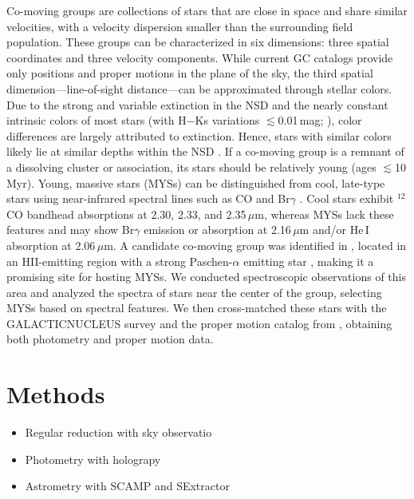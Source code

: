 \documentclass{aa} %
\begin{document}
{	Co-moving groups are collections of stars that are close in space and share similar velocities, with a velocity dispersion smaller than the surrounding field population. These groups can be characterized in six dimensions: three spatial coordinates and three velocity components. While current GC catalogs provide only positions and proper motions in the plane of the sky, the third spatial dimension—line-of-sight distance—can be approximated through stellar colors. Due to the strong and variable extinction in the NSD \citep{GNSIV, Ban_catalog, paco_NSD} and the nearly constant intrinsic colors of most stars (with H$-$Ks variations $\lesssim$0.01\,mag; \citealt[see Fig.~33]{GNSI}), color differences are largely attributed to extinction. Hence, stars with similar colors likely lie at similar depths within the NSD \citep{paco_NSD}.
	If a co-moving group is a remnant of a dissolving cluster or association, its stars should be relatively young (ages $\lesssim$10\,Myr). Young, massive stars (MYSs) can be distinguished from cool, late-type stars using near-infrared spectral lines such as CO and Br$\gamma$ \citep{spec_class_1, spec_class_2}. Cool stars exhibit $^{12}$CO bandhead absorptions at 2.30, 2.33, and 2.35\,$\mu$m, whereas MYSs lack these features and may show Br$\gamma$ emission or absorption at 2.16\,$\mu$m and/or He\,I absorption at 2.06\,$\mu$m.
	A candidate co-moving group was identified in \citet{Ban_cluster}, located in an HII-emitting region \citep{HII_regions} with a strong Paschen-$\alpha$ emitting star \citep{Blue_SG, Massive_stars}, making it a promising site for hosting MYSs. We conducted spectroscopic observations of this area and analyzed the spectra of stars near the center of the group, selecting MYSs based on spectral features. We then cross-matched these stars with the GALACTICNUCLEUS survey \citep{GNSI, GNSII} and the proper motion catalog from \citet{LIBRALA2021}, obtaining both photometry and proper motion data.}
	
	\section{Methods}
	
	\begin{itemize}
		\item Regular reduction with sky observatio
		\item Photometry with holograpy
	     \item Astrometry with SCAMP and SExtractor	
	\end{itemize} 
	
\end{document}
